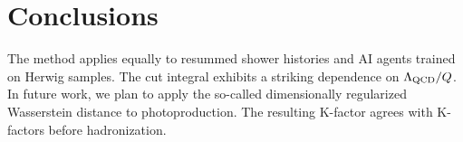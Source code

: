 \section{Conclusions}\label{sec:conclusions}

The method applies equally to resummed shower histories and AI agents
trained on Herwig samples. The cut integral exhibits a striking
dependence on $\Lambda_{\rm QCD}/Q$. In future work, we plan to apply
the so-called dimensionally regularized Wasserstein distance to
photoproduction. The resulting K-factor agrees with K-factors before
hadronization.

